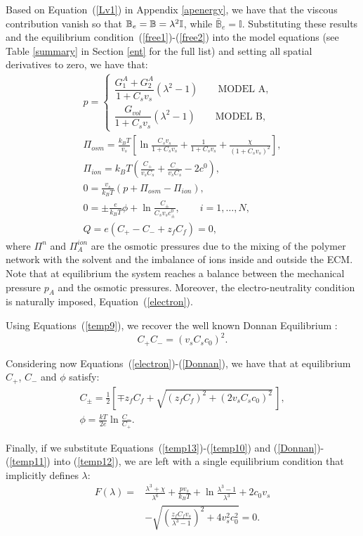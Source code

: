 Based on Equation~(\ref{Lv1}) in Appendix \ref{apenergy}, we have that the viscous contribution vanish so that $\mathbb{B}_e=\mathbb{B}= \lambda^2 \mathbb{I}$, while $\bar{\mathbb{B}}_e=\mathbb{I}$. Substituting these results and the equilibrium condition~(\ref{free1})-(\ref{free2}) into the model equations (see Table \ref{summary} in Section \ref{ent} for the full list) and setting all spatial derivatives to zero, we have that:
\begin{gather}
p = \begin{cases}
\dfrac{G^A_{1}+G^A_2}{1+C_s v_s}(\lambda^2-1)\qquad \text{MODEL A},\\[10pt]
\dfrac{G_{vol}}{1+C_s v_s}(\lambda^2-1)\qquad \text{MODEL B},
\end{cases}\label{presA}\\[5pt]
\Pi_{osm} = \frac{k_BT}{v_s} \left[\ln \frac{C_s v_s}{1+C_s v_s} + \frac{1}{1+C_sv_s} +\frac{\chi}{(1+C_s v_s)^2}\right],\label{temp13}\\
\Pi_{ion} = k_B T \left(\frac{C_+}{v_sC_s}+\frac{C_-}{v_sC_s}-2c^0\right),\label{temp10}\\
0 = \frac{v_s}{k_BT} (p+\Pi_{osm}-\Pi_{ion}),\label{temp12}\\[2mm]
0 = \pm\frac{e}{k_B T} \phi  + \ln \frac{C_\pm}{C_s v_s c_\pm^0},\qquad i=1,\ldots,N,\label{temp9}\\[2.5mm]
Q = e\left(C_+-C_-+z_f C_{f}\right)=0,\label{electron}
\end{gather}
where $\Pi^{n}$ and $\Pi^{ion}_A$ are the osmotic pressures due to the mixing of the polymer network with the solvent and the imbalance of ions inside and outside the ECM. 
Note that at equilibrium the system reaches a balance between the mechanical pressure $p_A$ and the osmotic pressures. Moreover, the electro-neutrality condition is naturally imposed, Equation~(\ref{electron}). 


Using Equations~(\ref{temp9}), we recover the well known Donnan Equilibrium \cite{DROZDOVph}:
\begin{equation}
C_+C_- = (v_sC_sc_0)^2.\label{Donnan}
\end{equation} 

Considering now Equations~(\ref{electron})-(\ref{Donnan}), we have that at equilibrium $C_+$, $C_-$ and $\phi$ satisfy:
\begin{eqnarray}
C_{\pm}= \frac{1}{2}\left[\mp z_fC_f+ \sqrt{(z_fC_f)^2+(2v_sC_sc_0)^2}\,\right],\label{eqion}\\
\phi = \frac{kT}{2e} \ln \frac{C_-}{C_+}.\label{temp11}
\end{eqnarray}

Finally, if we substitute Equations~(\ref{temp13})-(\ref{temp10}) and (\ref{Donnan})-(\ref{temp11}) into (\ref{temp12}), we are left with a single equilibrium condition that implicitly defines $\lambda$:
\begin{equation}
\begin{aligned}
F(\lambda)=&\frac{\lambda^3+\chi}{\lambda^6}+\frac{p v_s}{k_BT}+\ln \frac{\lambda^3-1}{\lambda^3} +2c_0v_s\\[1.5mm]
&-\sqrt{\left(\frac{z_fC_fv_s}{\lambda^3-1}\right)^2+4v_s^2c^2_0} =0.
\end{aligned}
\end{equation}